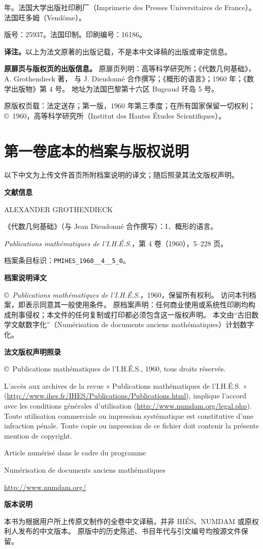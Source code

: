  年。法国大学出版社印刷厂（Imprimerie des Presses Universitaires de France）。法国旺多姆（Vendôme）。

\medskip
版号：25937。法国印制。印刷编号：16186。

\bigskip
\noindent\textbf{译注。}以上为法文原著的出版记载，不是本中文译稿的出版或审定信息。

\bigskip
\noindent\textbf{原扉页与版权页的出版信息。}
原扉页列明：高等科学研究所；《代数几何基础》，A. Grothendieck 著，
与 J. Dieudonné 合作撰写；《概形的语言》；1960 年；《数学出版物》第 4 号。
地址为法国巴黎第十六区 Bugeaud 环岛 5 号。

\medskip
原版权页载：法定送存；第一版，1960 年第三季度；在所有国家保留一切权利；
\copyright\ 1960，高等科学研究所（Institut des Hautes Études Scientifiques）。



\par

\chapter{第一卷底本的档案与版权说明}
以下中文为上传文件首页所附档案说明的译文；随后照录其法文版权声明。

\medskip
\noindent\textbf{文献信息}

ALEXANDER GROTHENDIECK\par
《代数几何基础》（与 Jean Dieudonné 合作撰写）：I．概形的语言。\par
\textit{Publications mathématiques de l'I.H.É.S.}，第 4 卷（1960），5–228 页。\par
档案条目标识：\texttt{PMIHES\_1960\_\_4\_\_5\_0}。

\medskip
\noindent\textbf{档案说明译文}

\copyright\ \textit{Publications mathématiques de l'I.H.É.S.}，1960，保留所有权利。
访问本刊档案，即表示同意其一般使用条件。
原档案声明：任何商业使用或系统性印刷均构成刑事侵权；本文件的任何复制或打印都必须包含这一版权声明。
本文由“古旧数学文献数字化”（Numérisation de documents anciens mathématiques）计划数字化。

\medskip
\noindent\textbf{法文版权声明照录}

\begingroup\small
\noindent
\copyright\ Publications mathématiques de l'I.H.É.S., 1960, tous droits réservés.

L'accès aux archives de la revue « Publications mathématiques de l'I.H.É.S. »
(\url{http://www.ihes.fr/IHES/Publications/Publications.html}), implique l'accord avec les conditions générales
 d'utilisation (\url{http://www.numdam.org/legal.php}).
Toute utilisation commerciale ou impression systématique est constitutive d'une infraction pénale.
Toute copie ou impression de ce fichier doit contenir la présente mention de copyright.

Article numérisé dans le cadre du programme\par
Numérisation de documents anciens mathématiques\par
\url{http://www.numdam.org/}
\endgroup

\medskip
\noindent\textbf{版本说明}

本书为根据用户所上传原文制作的全卷中文译稿，并非 IHÉS、NUMDAM 或原权利人发布的中文版本。
原版中的历史陈述、书目年代与引文编号均按源文件保留。




